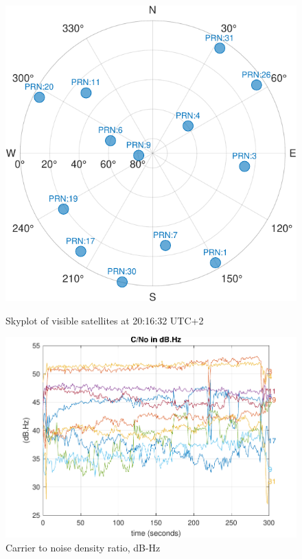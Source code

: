 \begin{figure}[H]
    \centering
    \begin{minipage}[b]{0.40\linewidth}
        \centering
        \includegraphics[width=\linewidth]{images/skyplot_punto_3.pdf}
        \caption{Skyplot of visible satellites at 20:16:32 UTC+2}
        \label{fig:skyplot_punto_3}
    \end{minipage}
    \hfill
    \begin{minipage}[b]{0.56\linewidth}
        \centering
        \includegraphics[width=\linewidth]{images/CN0_punto_3.pdf}
        \caption{Carrier to noise density ratio, dB-Hz}
        \label{fig:CN0_punto_3}
    \end{minipage}
\end{figure}

